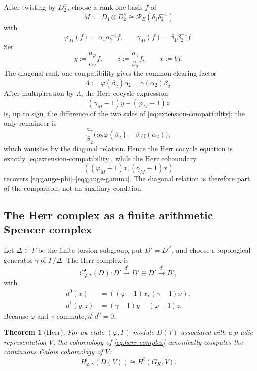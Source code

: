 \documentclass[11pt]{article}
\newtheorem{theorem}{Theorem}[section]
\theoremstyle{definition}
\newcommand{\GK}{G_K}
\newcommand{\cR}{\mathcal R}
\begin{document}
After twisting by $D_2^\vee$, choose a rank-one basis $f$ of
\[
M:=D_1\otimes D_2^\vee\cong \cR_E(\delta_1\delta_2^{-1})
\]
with
\[
\varphi_M(f)=\alpha_1\alpha_2^{-1}f,
\qquad
\gamma_M(f)=\beta_1\beta_2^{-1}f.
\]
Set
\begin{equation}\label{eq:herr-normalization}
y:=\frac{a_\varphi}{\alpha_2}f,
\qquad
z:=\frac{a_\gamma}{\beta_2}f,
\qquad
x:=bf.
\end{equation}
The diagonal rank-one compatibility gives the common clearing factor
\[
\Lambda:=\varphi(\beta_2)\alpha_2
=\gamma(\alpha_2)\beta_2.
\]
After multiplication by $\Lambda$, the Herr cocycle expression
\[
(\gamma_M-1)y-(\varphi_M-1)z
\]
is, up to sign, the difference of the two sides of \eqref{eq:extension-compatibility}; the only remainder is
\[
\frac{a_\gamma}{\beta_2}
\bigl(\alpha_2\varphi(\beta_2)-\beta_2\gamma(\alpha_2)\bigr),
\]
which vanishes by the diagonal relation.  Hence the Herr cocycle equation is exactly \eqref{eq:extension-compatibility}, while the Herr coboundary
\[
((\varphi_M-1)x,(\gamma_M-1)x)
\]
recovers \eqref{eq:gauge-phi}--\eqref{eq:gauge-gamma}.  The diagonal relation is therefore part of the comparison, not an auxiliary condition.

\subsection{The Herr complex as a finite arithmetic Spencer complex}

Let $\Delta\subset\Gamma$ be the finite torsion subgroup, put $D'=D^\Delta$, and choose a topological generator $\gamma$ of $\Gamma/\Delta$.  The Herr complex is
\begin{equation}\label{eq:herr-complex}
C^\bullet_{\varphi,\gamma}(D):
D'
\xrightarrow{d^0}
D'\oplus D'
\xrightarrow{d^1}
D',
\end{equation}
with
\begin{align}
 d^0(x)&=((\varphi-1)x,(\gamma-1)x),\label{eq:herr-d0}\\
 d^1(y,z)&=(\gamma-1)y-(\varphi-1)z.\label{eq:herr-d1}
\end{align}
Because $\varphi$ and $\gamma$ commute, $d^1d^0=0$.

\begin{theorem}[Herr]\label{thm:herr}
For an etale $(\varphi,\Gamma)$-module $D(V)$ associated with a $p$-adic representation $V$, the cohomology of \eqref{eq:herr-complex} canonically computes the continuous Galois cohomology of $V$:
\[
H^i_{\varphi,\gamma}(D(V))\cong H^i(\GK,V).
\]
\end{theorem}
\end{document}
